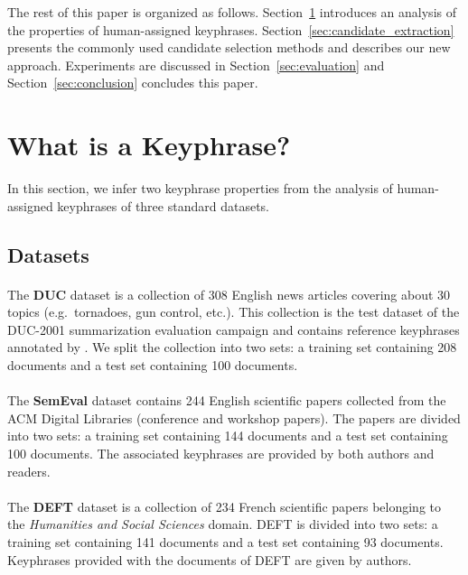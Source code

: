   The rest of this paper is organized as follows.
  Section~\ref{sec:definition_of_candidate_keyphrases} introduces an analysis of
  the properties of human-assigned keyphrases.
  Section~\ref{sec:candidate_extraction} presents the commonly used candidate
  selection methods and describes our new approach. Experiments are discussed in
  Section~\ref{sec:evaluation} and Section~\ref{sec:conclusion} concludes this
  paper.

\section{What is a Keyphrase?}
\label{sec:definition_of_candidate_keyphrases}
  In this section, we infer two keyphrase properties from the analysis of
  human-assigned keyphrases of three standard datasets.

  \subsection{Datasets}
  \label{subsec:keyphrase_extraction_datasets}
    \paragraph{}
    The \textbf{DUC} dataset \cite{over2001duc} is a collection of 308 English
    news articles covering about 30 topics (e.g.~tornadoes, gun control, etc.).
    This collection is the test dataset of the DUC-2001 summarization evaluation
    campaign and contains reference keyphrases annotated by
    . We split the collection into two sets: a
    training set containing 208 documents and a test set containing 100
    documents.

    \paragraph{}
    The \textbf{SemEval} dataset \cite{kim2010semeval} contains 244 English
    scientific papers collected from the ACM Digital Libraries (conference and
    workshop papers). The papers are divided into two sets: a training set
    containing 144 documents and a test set containing 100 documents. The
    associated keyphrases are provided by both authors and readers.

    \paragraph{}
    The \textbf{DEFT} dataset \cite{paroubek2012deft} is a collection of 234
    French scientific papers belonging to the \textit{Humanities and Social
    Sciences} domain. DEFT is divided into two sets: a training set containing
    141 documents and a test set containing 93 documents. Keyphrases provided
    with the documents of DEFT are given by authors.

